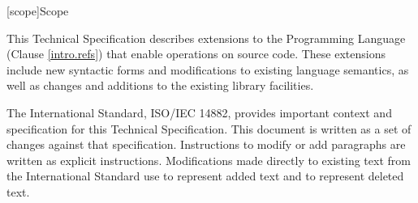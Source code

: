
[scope]{Scope}

\pnum
This Technical Specification describes extensions to the \Cpp Programming
Language (Clause \ref{intro.refs}) that enable operations on source code. These
extensions include new syntactic forms and modifications to existing language
semantics, as well as changes and additions to the existing library facilities.

\pnum
The International Standard, ISO/IEC 14882, provides important context and
specification for this Technical Specification.  This document is written as a
set of changes against that specification.  Instructions to modify or add
paragraphs are written as explicit instructions.  Modifications made directly to
existing text from the International Standard use  to
represent added text and  to represent deleted text.

